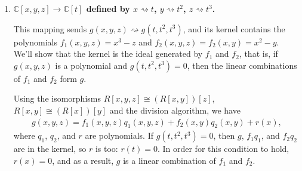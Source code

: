 \documentclass[a4paper,12pt]{article}
\begin{document}
\begin{enumerate}
\begin{enumerate}
              \item
                \boldmath
                \textbf{$\mathbb{C}[x, y, z] \to \mathbb{C}[t]$ defined by $x \rightsquigarrow t$, $y \rightsquigarrow t^2$, $z \rightsquigarrow t^3$.} \par
                \unboldmath
                This mapping sends $g(x, y, z) \rightsquigarrow g(t, t^2, t^3)$, and its kernel contains the polynomials $f_1(x, y, z) = x^3 - z$ and $f_2(x, y, z) = f_2(x, y) = x^2 - y$. We'll show that the kernel is the ideal generated by $f_1$ and $f_2$, that is, if $g(x, y, z)$ is a polynomial and $g(t, t^2, t^3) = 0$, then the linear combinations of $f_1$ and $f_2$ form $g$. \par
                \iffalse
                    First, we regard $f_1$ as a polynomial in $x$ whose coefficients are polynomials in $z$. $f_1$ is monic in $x$, and polynomial division with remainder gives $g = f_1 q_1 + r_1$, where $q_1$ and $r_1$ are polynomials and $r_1$, if nonzero, has degree at most $2$ in $x$. Hence, $r_1$ may be written $r_1(x, y, z) = \rho_5(y, z) x^2 + \rho_4(y, z) x + \rho_3(y, z)$. \par
                    If we then regard $f_2$ as a polynomial in $x$ whose coefficients are polynomials in $y$, then $f_2$ is monic in $x$, and polynomial division with remainder gives $r_1 = f_2 q_2 + r_2$, where $q_2$ and $r_2$ are polynomials and $r_2$, if nonzero, has degree at most $1$ in $x$. Hence, $r_2$ may be written $r_2(x, y, z) = \rho_1(y, z) x + \rho_0(y, z)$. \par
                If $g(t, t^2, t^3) = 0$, then both $g$ and $f_1 q_1$ are in the kernel, so $r_1$ is too, and by a similar argument $r_2$ is in the kernel as well: $r_2(t, t^2, t^3) = \rho_1(t^2, t^3) t + \rho_0(t^2, t^3) = 0$. The monomials that appear in $\rho_1(t^2, t^3) x$ must have odd degree, while those that appear in $\rho_0(t^2, t^3)$ must have even degree, so for the previous condition to be true, $\rho_0(y, z)$ and $\rho_1(y, z)$ must both be zero. Since the remainder $r_2$ is zero, $f_2$ divides $r_1$.
                \fi
                Using the isomorphisms $R[x, y, z] \cong (R[x, y])[z]$, $R[x, y] \cong (R[x])[y]$ and the division algorithm, we have
                \begin{align*}
                    g(x, y, z) = f_1(x, y, z) q_1(x, y, z) + f_2(x, y) q_2(x, y) + r(x),
                \end{align*}
                where $q_1$, $q_2$, and $r$ are polynomials.
                If $g(t, t^2, t^3) = 0$, then $g$, $f_1 q_1$, and $f_2 q_2$ are in the kernel, so $r$ is too: $r(t) = 0$. In order for this condition to hold, $r(x) = 0$, and as a result, $g$ is a linear combination of $f_1$ and $f_2$.
        \end{enumerate}


\end{enumerate}
\end{document}
